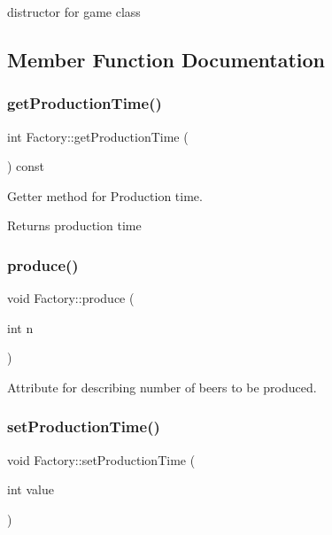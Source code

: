 distructor for game class 



\subsection{Member Function Documentation}
\mbox{\label{class_factory_a7020f06a3b9045d0902cd3740796ded5}} 
\subsubsection{\texorpdfstring{get\+Production\+Time()}{getProductionTime()}}
{\footnotesize\ttfamily int Factory\+::get\+Production\+Time (\begin{DoxyParamCaption}{ }\end{DoxyParamCaption}) const}



Getter method for Production time. 

\begin{DoxyReturn}{Returns}
production time 
\end{DoxyReturn}
\mbox{\label{class_factory_a321703fafe2a870260e04b848aa565d2}} 
\subsubsection{\texorpdfstring{produce()}{produce()}}
{\footnotesize\ttfamily void Factory\+::produce (\begin{DoxyParamCaption}\item[{int}]{n }\end{DoxyParamCaption})}



Attribute for describing number of beers to be produced. 

\mbox{\label{class_factory_a8567550501860453df05d6afae963997}} 
\subsubsection{\texorpdfstring{set\+Production\+Time()}{setProductionTime()}}
{\footnotesize\ttfamily void Factory\+::set\+Production\+Time (\begin{DoxyParamCaption}\item[{int}]{value }\end{DoxyParamCaption})}



